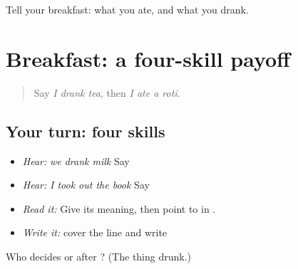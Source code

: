 \begin{tcolorbox}[breakable,colback=teal!4,colframe=teal!35!black,title={Before you move on}]
Tell your breakfast: what you ate, and what you drank.
\end{tcolorbox}
\section[\texorpdfstring{\pa{ਮੈਂ} \pa{ਚਾਹ} \pa{ਪੀਤੀ।} (maiṁ chāh pītī.)}{ਮੈਂ ਚਾਹ ਪੀਤੀ। (maiṁ chāh pītī.)}]{Breakfast: a four-skill payoff}

\label{lesson:PA-C219-payoff}



\begin{quote}
Say \emph{I drank tea}, then \emph{I ate a roti}.
\end{quote}

\subsection*{Your turn: four skills}
\begin{itemize}
\raggedright
  \item \emph{Hear:} \emph{we drank milk} Say \textbf{  }
  \item \emph{Hear:} \emph{I took out the book} Say \textbf{  }
  \item \emph{Read it:} \textbf{   } Give its meaning, then point to \textbf{} in \textbf{}.
  \item \emph{Write it:} cover the line and write \textbf{  }
\end{itemize}

\begin{tcolorbox}[breakable,colback=teal!4,colframe=teal!35!black,title={Before you move on}]
Who decides \textbf{} or \textbf{} after \textbf{}? (The thing drunk.)
\end{tcolorbox}
